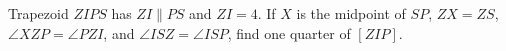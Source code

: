 Trapezoid $ZIPS$ has $ZI\parallel PS$ and $ZI=4$. If $X$ is the midpoint of $SP$, $ZX=ZS$, $\angle XZP=\angle PZI$, and $\angle ISZ=\angle ISP$, find one quarter of $[ZIP]$.
